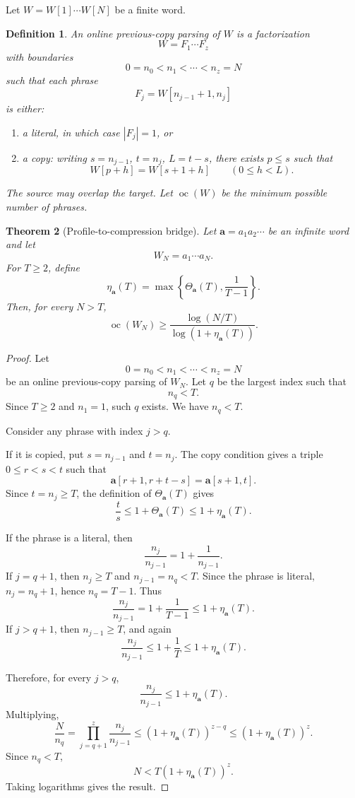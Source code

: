 \documentclass[11pt]{amsart}
\newtheorem{theorem}{Theorem}[section]
\newtheorem{definition}[theorem]{Definition}
\DeclareMathOperator{\oc}{oc}
\begin{document}
Let \(W=W[1]\cdots W[N]\) be a finite word.

\begin{definition}
An online previous-copy parsing of \(W\) is a factorization
\[
W=F_1\cdots F_z
\]
with boundaries
\[
0=n_0<n_1<\cdots<n_z=N
\]
such that each phrase
\[
F_j=W[n_{j-1}+1,n_j]
\]
is either:
\begin{enumerate}[label=\textup{\(\roman*\)}]
\item a literal, in which case \(|F_j|=1\), or
\item a copy: writing \(s=n_{j-1}\), \(t=n_j\), \(L=t-s\), there exists \(p\leq s\) such that
\[
W[p+h]=W[s+1+h]
\qquad(0\leq h<L).
\]
\end{enumerate}
The source may overlap the target. Let \(\oc(W)\) be the minimum possible number of phrases.
\end{definition}

\begin{theorem}[Profile-to-compression bridge]
Let \(\mathbf a=a_1a_2\cdots\) be an infinite word and let
\[
W_N=a_1\cdots a_N.
\]
For \(T\geq 2\), define
\[
\eta_{\mathbf a}(T)
=
\max\left\{\Theta_{\mathbf a}(T),\frac{1}{T-1}\right\}.
\]
Then, for every \(N>T\),
\[
\oc(W_N)
\geq
\frac{\log(N/T)}{\log(1+\eta_{\mathbf a}(T))}.
\]
\end{theorem}

\begin{proof}
Let
\[
0=n_0<n_1<\cdots<n_z=N
\]
be an online previous-copy parsing of \(W_N\). Let \(q\) be the largest index such that
\[
n_q<T.
\]
Since \(T\geq 2\) and \(n_1=1\), such \(q\) exists. We have \(n_q<T\).

Consider any phrase with index \(j>q\).

If it is copied, put \(s=n_{j-1}\) and \(t=n_j\). The copy condition gives a triple \(0\leq r<s<t\) such that
\[
\mathbf a[r+1,r+t-s]=\mathbf a[s+1,t].
\]
Since \(t=n_j\geq T\), the definition of \(\Theta_{\mathbf a}(T)\) gives
\[
\frac{t}{s}\leq 1+\Theta_{\mathbf a}(T)
\leq 1+\eta_{\mathbf a}(T).
\]

If the phrase is a literal, then
\[
\frac{n_j}{n_{j-1}}
=
1+\frac{1}{n_{j-1}}.
\]
If \(j=q+1\), then \(n_j\geq T\) and \(n_{j-1}=n_q<T\). Since the phrase is literal, \(n_j=n_q+1\), hence \(n_q=T-1\). Thus
\[
\frac{n_j}{n_{j-1}}
=
1+\frac{1}{T-1}
\leq 1+\eta_{\mathbf a}(T).
\]
If \(j>q+1\), then \(n_{j-1}\geq T\), and again
\[
\frac{n_j}{n_{j-1}}
\leq
1+\frac{1}{T}
\leq 1+\eta_{\mathbf a}(T).
\]

Therefore, for every \(j>q\),
\[
\frac{n_j}{n_{j-1}}
\leq
1+\eta_{\mathbf a}(T).
\]
Multiplying,
\[
\frac{N}{n_q}
=
\prod_{j=q+1}^{z}\frac{n_j}{n_{j-1}}
\leq
(1+\eta_{\mathbf a}(T))^{z-q}
\leq
(1+\eta_{\mathbf a}(T))^z.
\]
Since \(n_q<T\),
\[
N<T(1+\eta_{\mathbf a}(T))^z.
\]
Taking logarithms gives the result.
\end{proof}
\end{document}
